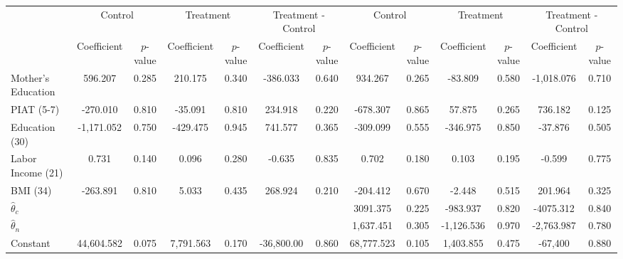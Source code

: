 \begin{tabular}{lcccccccccccc} \toprule
&\multicolumn{2}{c}{Control} & \multicolumn{2}{c}{Treatment} & \multicolumn{2}{c}{Treatment - Control} & \multicolumn{2}{c}{Control} & \multicolumn{2}{c}{Treatment} & \multicolumn{2}{c}{Treatment - Control} \\
 & Coefficient  & $p$-value  & Coefficient  & $p$-value & Coefficient  & $p$-value  & Coefficient  & $p$-value  & Coefficient  & $p$-value  & Coefficient  & $p$-value \\ \midrule
Mother's Education &   596.207 &     0.285 &   210.175 &     0.340 &  -386.033 &     0.640 &   934.267 &     0.265 &   -83.809 &     0.580 & -1,018.076 &     0.710 \\  
PIAT (5-7) &  -270.010 &     0.810 &   -35.091 &     0.810 &   234.918 &     0.220 &  -678.307 &     0.865 &    57.875 &     0.265 &   736.182 &     0.125 \\  
Education (30) & -1,171.052 &     0.750 &  -429.475 &     0.945 &   741.577 &     0.365 &  -309.099 &     0.555 &  -346.975 &     0.850 &   -37.876 &     0.505 \\  
Labor Income (21) &     0.731 &     0.140 &     0.096 &     0.280 &    -0.635 &     0.835 &     0.702 &     0.180 &     0.103 &     0.195 &    -0.599 &     0.775 \\  
BMI (34) &  -263.891 &     0.810 &     5.033 &     0.435 &   268.924 &     0.210 &  -204.412 &     0.670 &    -2.448 &     0.515 &   201.964 &     0.325 \\  
$\hat{\theta}_{c}$ &         &         &         &         &         &         &  3091.375 &     0.225 &  -983.937 &     0.820 & -4075.312 &     0.840 \\  
$\hat{\theta}_{n}$ &         &         &         &         &         &         &  1,637.451 &     0.305 & -1,126.536 &     0.970 & -2,763.987 &     0.780 \\  
Constant & 44,604.582 &     0.075 &  7,791.563 &     0.170 & -36,800.00 &     0.860 & 68,777.523 &     0.105 &  1,403.855 &     0.475 & -67,400 &     0.880 \\  
\bottomrule \end{tabular}
